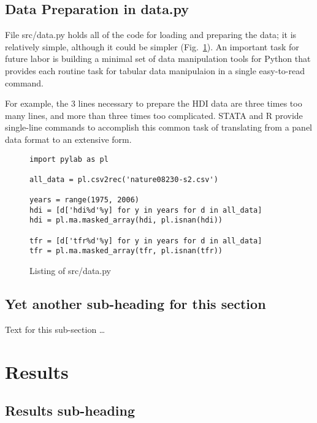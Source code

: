 \documentclass[10pt]{bmc_article}
\newenvironment{bmcformat}{\begin{raggedright}\baselineskip20pt\sloppy\setboolean{publ}{false}}{\end{raggedright}\baselineskip20pt\sloppy}
\begin{document}
\begin{bmcformat}
  \subsection*{Data Preparation in data.py}
  File src/data.py holds all of the code for loading and preparing the
  data; it is relatively simple, although it could be simpler
  (Fig.~\ref{src/data.py}).  An important task for future labor is
  building a minimal set of data manipulation tools for Python that
  provides each routine task for tabular data manipulaion in a single
  easy-to-read command.

  For example, the 3 lines necessary to prepare the HDI data are three
  times too many lines, and more than three times too complicated.
  STATA and R provide single-line commands to accomplish this common
  task of translating from a panel data format to an extensive form.
\begin{figure}
  \begin{verbatim}
import pylab as pl

all_data = pl.csv2rec('nature08230-s2.csv')

years = range(1975, 2006)
hdi = [d['hdi%d'%y] for y in years for d in all_data]
hdi = pl.ma.masked_array(hdi, pl.isnan(hdi))

tfr = [d['tfr%d'%y] for y in years for d in all_data]
tfr = pl.ma.masked_array(tfr, pl.isnan(tfr))
\end{verbatim}
\caption{Listing of src/data.py}
\label{src/data.py}
\end{figure}
  \subsection*{Yet another sub-heading for this section}
    Text for this sub-section \ldots


 

\section*{Results}
  \subsection*{Results sub-heading}

\end{bmcformat}
\end{document}
